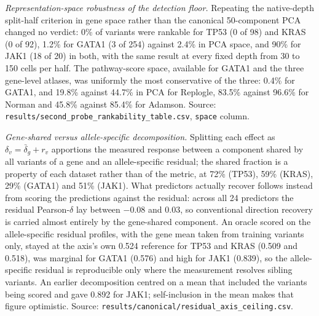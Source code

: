 \documentclass[11pt,letterpaper]{article}
\begin{document}
\medskip
\noindent\textit{Representation-space robustness of the detection floor.} Repeating the native-depth split-half criterion in gene space rather than the canonical 50-component PCA changed no verdict: 0\% of variants were rankable for TP53 (0 of 98) and KRAS (0 of 92), 1.2\% for GATA1 (3 of 254) against 2.4\% in PCA space, and 90\% for JAK1 (18 of 20) in both, with the same result at every fixed depth from 30 to 150 cells per half. The pathway-score space, available for GATA1 and the three gene-level atlases, was uniformly the most conservative of the three: 0.4\% for GATA1, and 19.8\% against 44.7\% in PCA for Replogle, 83.5\% against 96.6\% for Norman and 45.8\% against 85.4\% for Adamson. Source: \texttt{results/second\_probe\_rankability\_table.csv}, \texttt{space} column.

\smallskip
\noindent\textit{Gene-shared versus allele-specific decomposition.} Splitting each effect as $\delta_v = \bar{\delta}_g + r_v$ apportions the measured response between a component shared by all variants of a gene and an allele-specific residual; the shared fraction is a property of each dataset rather than of the metric, at 72\% (TP53), 59\% (KRAS), 29\% (GATA1) and 51\% (JAK1). What predictors actually recover follows instead from scoring the predictions against the residual: across all 24 predictors the residual Pearson-$\delta$ lay between $-0.08$ and $0.03$, so conventional direction recovery is carried almost entirely by the gene-shared component. An oracle scored on the allele-specific residual profiles, with the gene mean taken from training variants only, stayed at the axis's own 0.524 reference for TP53 and KRAS (0.509 and 0.518), was marginal for GATA1 (0.576) and high for JAK1 (0.839), so the allele-specific residual is reproducible only where the measurement resolves sibling variants. An earlier decomposition centred on a mean that included the variants being scored and gave 0.892 for JAK1; self-inclusion in the mean makes that figure optimistic. Source: \texttt{results/canonical/residual\_axis\_ceiling.csv}.
\end{document}
